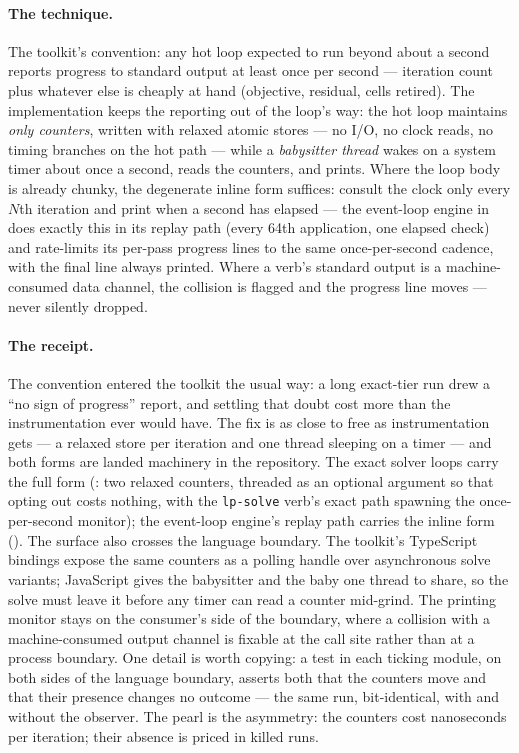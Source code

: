 \paragraph{The technique.} The toolkit's convention: any hot loop
expected to run beyond about a second reports progress to standard
output at least once per second --- iteration count plus whatever else
is cheaply at hand (objective, residual, cells retired). The
implementation keeps the reporting out of the loop's way: the hot loop
maintains \emph{only counters}, written with relaxed atomic stores ---
no I/O, no clock reads, no timing branches on the hot path --- while a
\emph{babysitter thread} wakes on a system timer about once a second,
reads the counters, and prints. Where the loop body is already chunky,
the degenerate inline form suffices: consult the clock only every
$N$th iteration and print when a second has elapsed --- the event-loop
engine in  does exactly this in its replay
path (every 64th application, one elapsed check) and rate-limits its
per-pass progress lines to the same once-per-second cadence, with the
final line always printed. Where a verb's
standard output is a machine-consumed data channel, the collision is
flagged and the progress line moves --- never silently dropped.

\paragraph{The receipt.} The convention entered the toolkit the usual
way: a long exact-tier run drew a ``no sign of progress'' report, and
settling that doubt cost more than the instrumentation ever would
have. The fix is as close to free as instrumentation gets --- a
relaxed store per iteration and one thread sleeping on a timer --- and
both forms are landed machinery in the  repository. The
exact solver loops carry the full form
(: two relaxed counters, threaded as
an optional argument so that opting out costs nothing, with the
\texttt{lp-solve} verb's exact path spawning the once-per-second
monitor); the
event-loop engine's replay path carries the inline form
(). The surface also crosses
the language boundary. The toolkit's TypeScript bindings expose the
same counters as a polling handle over asynchronous solve variants;
JavaScript gives the babysitter and the baby one thread to share, so
the solve must leave it before any timer can read a counter mid-grind.
The printing monitor stays on the consumer's side of the boundary,
where a collision with a machine-consumed output channel is fixable at
the call site rather than at a process boundary. One detail is worth copying: a test in
each ticking module, on both sides of the language boundary, asserts
both that the counters move and that their presence changes no outcome
--- the same run, bit-identical, with and without the observer. The pearl is the
asymmetry: the counters cost nanoseconds per iteration; their absence
is priced in killed runs.

